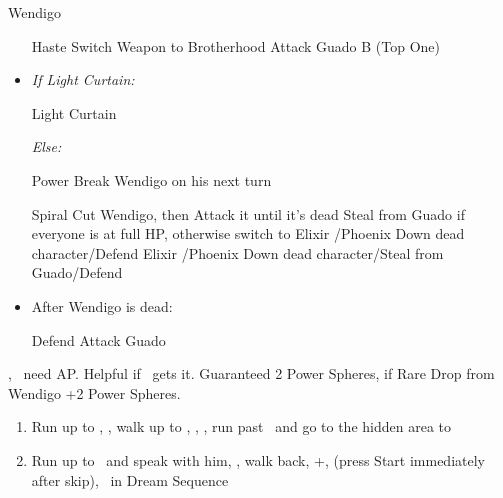 \begin{battle}[18000]{Wendigo}
    \begin{itemize}
        \tidusf Haste \tidus
        \tidusf Switch Weapon to Brotherhood
        \tidusf Attack Guado B (Top One)
        \item \textit{If Light Curtain:}
        \begin{itemize}
            \rikkuf Light Curtain \tidus
        \end{itemize}
        \textit{Else:}
        \begin{itemize}
            \switch{\rikku}{\auron}
            \auronf Power Break Wendigo
            \switch{\auron}{\rikku} on his next turn
        \end{itemize}
        \tidusf Spiral Cut Wendigo, then Attack it until it's dead
        \kimahrif Steal from Guado if everyone is at full HP, otherwise switch to \lulu
        \luluf Elixir \tidus/Phoenix Down dead character/Defend
        \rikkuf Elixir \tidus/Phoenix Down dead character/Steal from Guado/Defend
        \item After Wendigo is dead:
        \begin{itemize}
            \yunaf Defend
            \tidusf Attack Guado
        \end{itemize}
    \end{itemize}
    \yuna, \tidus\ need AP. Helpful if \lulu\ gets it.
    Guaranteed 2 Power Spheres, if Rare Drop from Wendigo +2 Power Spheres.
\end{battle}
\begin{enumerate}[resume]
    \item Run up to \rikku, \sd, walk up to \yuna, \sd, \save, run past \kimahri\ and go to the hidden area to 
    \winvfill
    \item Run up to \auron\ and speak with him, \sd, walk back, \cs+\skippablefmv[1:00], (press Start immediately after skip), \sd\ in Dream Sequence
\end{enumerate}